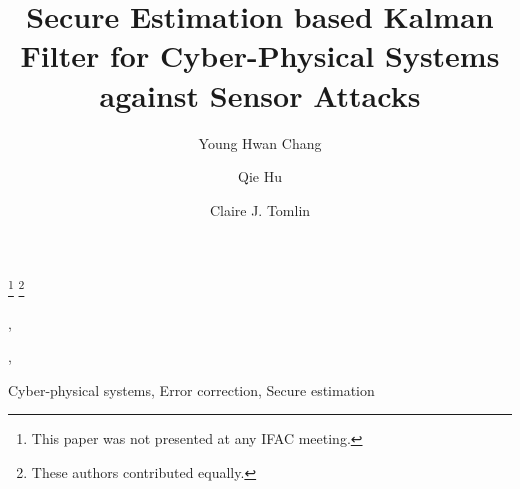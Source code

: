 \documentclass[twocolumn]{autart}    %
\begin{document}
\begin{frontmatter}

\title{Secure Estimation based Kalman Filter for Cyber-Physical Systems against Sensor Attacks} %

\thanks[footnoteinfo]{This paper was not presented at any IFAC 
meeting.}
\thanks[equal]{These authors contributed equally.}


\author[Chang,equal]{Young Hwan Chang},    %
\author[Hu,equal]{Qie Hu},               %
\author[Tomlin]{Claire J. Tomlin}  %


\address[Chang]{Department of Biomedical Engineering, Oregon Health and Science University, Portland, OR 97201 USA}  %
\address[Hu]{Department of Electrical Engineering and Computer Sciences, University of California, Berkeley, CA 94720 USA }             %
\address[Tomlin]{Department of Electrical Engineering and Computer Sciences, University of California, Berkeley, CA 94720 USA }        %

          
\begin{keyword}                           %
Cyber-physical systems, Error correction, Secure estimation              %
\end{keyword}                             %


\end{frontmatter}
\end{document}
